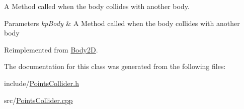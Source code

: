 A Method called when the body collides with another body. 


\begin{DoxyParams}{Parameters}
{\em kp\+Body} & A Method called when the body collides with another body \\
\hline
\end{DoxyParams}


Reimplemented from \hyperlink{class_body2_d_a55c37afe7eaa21a51cb309a2f52e0fcc}{Body2\+D}.



The documentation for this class was generated from the following files\+:\begin{DoxyCompactItemize}
\item 
include/\hyperlink{_points_collider_8h}{Points\+Collider.\+h}\item 
src/\hyperlink{_points_collider_8cpp}{Points\+Collider.\+cpp}\end{DoxyCompactItemize}
